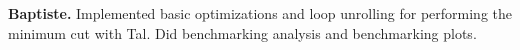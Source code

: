 \documentclass[letterpaper]{article}
\newcommand{\mypar}[1]{{\bf #1.}}
\begin{document}
\mypar{Baptiste} Implemented basic optimizations and loop unrolling for performing the minimum cut with Tal. Did benchmarking analysis and benchmarking plots.



\end{document}
